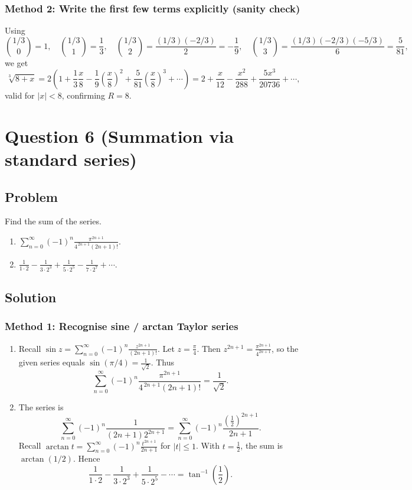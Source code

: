 \documentclass[12pt]{article}
\newcommand{\ds}{\displaystyle}
\begin{document}
\subsubsection*{Method 2: Write the first few terms explicitly (sanity check)}
Using
\[
\binom{1/3}{0}=1,\quad \binom{1/3}{1}=\frac13,\quad
\binom{1/3}{2}=\frac{(1/3)(-2/3)}{2}=-\frac{1}{9},\quad
\binom{1/3}{3}=\frac{(1/3)(-2/3)(-5/3)}{6}=\frac{5}{81},
\]
we get
\[
\sqrt[3]{8+x}
=2\left(1+\frac{1}{3}\frac{x}{8}-\frac{1}{9}\left(\frac{x}{8}\right)^2+\frac{5}{81}\left(\frac{x}{8}\right)^3+\cdots\right)
=2+\frac{x}{12}-\frac{x^2}{288}+\frac{5x^3}{20736}+\cdots,
\]
valid for \(|x|<8\), confirming \(R=8\).

\newpage
\section*{Question 6 (Summation via standard series)}
\subsection*{Problem}
Find the sum of the series.
\begin{enumerate}[label=(\alph*)]
  \item \(\ds \sum_{n=0}^{\infty}(-1)^n\frac{\pi^{2n+1}}{4^{\,2n+1}(2n+1)!}.\)
  \item \(\ds \frac{1}{1\cdot 2}-\frac{1}{3\cdot 2^3}+\frac{1}{5\cdot 2^5}-\frac{1}{7\cdot 2^7}+\cdots.\)
\end{enumerate}

\subsection*{Solution}

\subsubsection*{Method 1: Recognise sine / arctan Taylor series}
\begin{enumerate}[label=(\alph*)]
\item Recall \(\sin z=\sum_{n=0}^\infty (-1)^n\frac{z^{2n+1}}{(2n+1)!}\).
Let \(z=\frac{\pi}{4}\). Then \(z^{2n+1}=\frac{\pi^{2n+1}}{4^{2n+1}}\), so the given series equals \(\sin(\pi/4)=\frac{1}{\sqrt{2}}\).
Thus
\[
\boxed{\sum_{n=0}^{\infty}(-1)^n\frac{\pi^{2n+1}}{4^{\,2n+1}(2n+1)!}=\frac{1}{\sqrt{2}}.}
\]

\item The series is
\[
\sum_{n=0}^\infty (-1)^n\frac{1}{(2n+1)2^{2n+1}}
=\sum_{n=0}^\infty (-1)^n\frac{\left(\frac12\right)^{2n+1}}{2n+1}.
\]
Recall \(\arctan t=\sum_{n=0}^\infty (-1)^n\frac{t^{2n+1}}{2n+1}\) for \(|t|\le 1\).
With \(t=\frac12\), the sum is \(\arctan(1/2)\). Hence
\[
\boxed{\frac{1}{1\cdot 2}-\frac{1}{3\cdot 2^3}+\frac{1}{5\cdot 2^5}-\cdots=\tan^{-1}\!\left(\frac12\right).}
\]
\end{enumerate}
\end{document}
